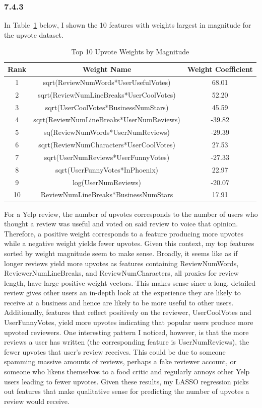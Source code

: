 \documentclass[12pt]{amsart}
\begin{document}
\subsubsection*{7.4.3}

In Table~\ref{tab:top_upvotes} below, I shown the 10 features with weights largest in magnitude for the upvote dataset.

\begin{table}[H]
	\centering
	\caption{Top 10 Upvote Weights by Magnitude}
	\begin{tabular}{ccc} 
		\hline
		Rank & Weight Name & Weight Coefficient \\
		\hline
		1 & sqrt(ReviewNumWords*UserUsefulVotes) & 68.01 \\
		2 & sqrt(ReviewNumLineBreaks*UserCoolVotes) & 52.20 \\
		3 & sqrt(UserCoolVotes*BusinessNumStars) & 45.59 \\
		4 & sqrt(ReviewNumLineBreaks*UserNumReviews) & -39.82 \\
		5 & sq(ReviewNumWords*UserNumReviews) & -29.39  \\ 
		6 & sqrt(ReviewNumCharacters*UserCoolVotes) & 27.53  \\
		7 & sqrt(UserNumReviews*UserFunnyVotes) & -27.33  \\
		8 & sqrt(UserFunnyVotes*InPhoenix) & 22.97  \\
		9 & log(UserNumReviews) & -20.07 \\
		10 & ReviewNumLineBreaks*BusinessNumStars & 17.91 \\
		\hline
	\end{tabular}
	\label{tab:top_upvotes}
\end{table}

For a Yelp review, the number of upvotes corresponds to the number of users who thought a review was useful and voted on said review to voice that opinion.  Therefore, a positive weight corresponds to a feature producing more upvotes while a negative weight yields fewer upvotes.  Given this context, my top features sorted by weight magnitude seem to make sense.  Broadly, it seems like as if longer reviews yield more upvotes as features containing ReviewNumWords, ReviewerNumLineBreaks, and ReviewNumCharacters, all proxies for review length, have large positive weight vectors.  This makes sense since a long, detailed review gives other users an in-depth look at the experience they are likely to receive at a business and hence are likely to be more useful to other users.  Additionally, features that reflect positively on the reviewer, UserCoolVotes and UserFunnyVotes, yield more upvotes indicating that popular users produce more upvoted reviewers.  One interesting pattern I noticed, however, is that the more reviews a user has written (the corresponding feature is UserNumReviews), the fewer upvotes that user's review receives.  This could be due to someone spamming massive amounts of reviews, perhaps a fake reviewer account, or someone who likens themselves to a food critic and regularly annoys other Yelp users leading to fewer upvotes.  Given these results, my LASSO regression picks out features that make qualitative sense for predicting the number of upvotes a review would receive.
\end{document}
